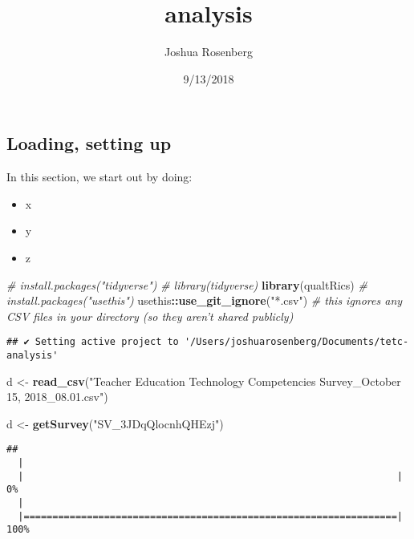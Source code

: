 \documentclass[]{article}
\title{analysis}
\author{Joshua Rosenberg}
\date{9/13/2018}
\newenvironment{Shaded}{\begin{snugshade}}{\end{snugshade}}
\newcommand{\KeywordTok}[1]{\textcolor[rgb]{0.13,0.29,0.53}{\textbf{#1}}}
\newcommand{\StringTok}[1]{\textcolor[rgb]{0.31,0.60,0.02}{#1}}
\newcommand{\CommentTok}[1]{\textcolor[rgb]{0.56,0.35,0.01}{\textit{#1}}}
\newcommand{\OperatorTok}[1]{\textcolor[rgb]{0.81,0.36,0.00}{\textbf{#1}}}
\newcommand{\NormalTok}[1]{#1}
\providecommand{\tightlist}{%
  \setlength{\itemsep}{0pt}\setlength{\parskip}{0pt}}
\begin{document}
\maketitle

\subsection{Loading, setting up}\label{loading-setting-up}

In this section, we start out by doing:

\begin{itemize}
\tightlist
\item
  x
\item
  y
\item
  z
\end{itemize}

\begin{Shaded}
\begin{Highlighting}[]
\CommentTok{# install.packages("tidyverse")}
\CommentTok{# library(tidyverse)}
\KeywordTok{library}\NormalTok{(qualtRics)}
\CommentTok{# install.packages("usethis")}
\NormalTok{usethis}\OperatorTok{::}\KeywordTok{use_git_ignore}\NormalTok{(}\StringTok{"*.csv"}\NormalTok{) }\CommentTok{# this ignores any CSV files in your directory (so they aren't shared publicly)}
\end{Highlighting}
\end{Shaded}

\begin{verbatim}
## ✔ Setting active project to '/Users/joshuarosenberg/Documents/tetc-analysis'
\end{verbatim}

\begin{Shaded}
\begin{Highlighting}[]
\NormalTok{d <-}\StringTok{ }\KeywordTok{read_csv}\NormalTok{(}\StringTok{"Teacher Education Technology Competencies Survey_October 15, 2018_08.01.csv"}\NormalTok{)}
\end{Highlighting}
\end{Shaded}

\begin{Shaded}
\begin{Highlighting}[]
\NormalTok{d <-}\StringTok{ }\KeywordTok{getSurvey}\NormalTok{(}\StringTok{"SV_3JDqQlocnhQHEzj"}\NormalTok{)}
\end{Highlighting}
\end{Shaded}

\begin{verbatim}
## 
  |                                                                       
  |                                                                 |   0%
  |                                                                       
  |=================================================================| 100%
\end{verbatim}
\end{document}
